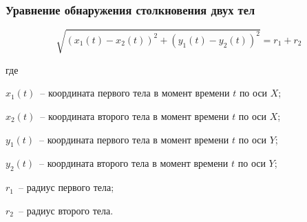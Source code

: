 \documentclass[xetex,aspectratio=43]{beamer}
\newenvironment{Underequation}{
    \small
    \noindent
    где
    \hspace{-1.45ex}
    \setlength{\parindent}{3.5ex}
}{}
\begin{document}
\begin{frame}
    \frametitle{Уравнение обнаружения столкновения двух тел}

    \begin{equation}\label{bodybodyoft}
        \sqrt{(x_1(t) - x_2(t))^2 + (y_1(t) - y_2(t))^2} = r_1 + r_2
    \end{equation}

    \begin{Underequation}
        \(x_1(t)\)~-- координата первого тела в момент времени \(t\) по оси \(X\);

        \(x_2(t)\)~-- координата второго тела в момент времени \(t\) по оси \(X\);

        \(y_1(t)\)~-- координата первого тела в момент времени \(t\) по оси \(Y\);

        \(y_2(t)\)~-- координата второго тела в момент времени \(t\) по оси \(Y\);

        \(r_1\)~-- радиус первого тела;

        \(r_2\)~-- радиус второго тела.
    \end{Underequation}

\end{frame}
\end{document}
